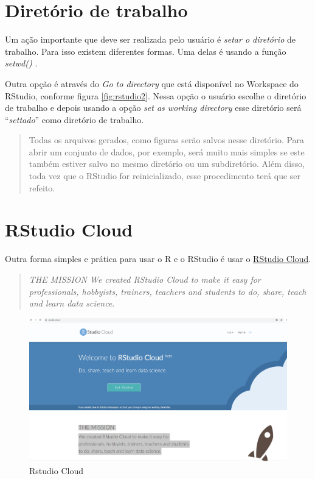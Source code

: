\documentclass[
]{book}
\theoremstyle{definition}
\theoremstyle{definition}
\theoremstyle{definition}
\theoremstyle{remark}
\begin{document}
\hypertarget{diretuxf3rio-de-trabalho}{%
\section{Diretório de trabalho}\label{diretuxf3rio-de-trabalho}}

Um ação importante que deve ser realizada pelo usuário é \emph{setar o diretório} de trabalho. Para isso existem diferentes formas. Uma delas é usando a função \emph{setwd()} .

Outra opção é através do \emph{Go to directory} que está disponível no Workspace do RStudio, conforme figura \ref{fig:rstudio2}. Nessa opção o usuário escolhe o diretório de trabalho e depois usando a opção \emph{set as working directory} esse diretório será ``\emph{settado}'' como diretório de trabalho.

\begin{quote}
Todas os arquivos gerados, como figuras serão salvos nesse diretório. Para abrir um conjunto de dados, por exemplo, será muito mais simples se este também estiver salvo no mesmo diretório ou um subdiretório. Além disso, toda vez que o RStudio for reinicializado, esse procedimento terá que ser refeito.
\end{quote}

\hypertarget{rstudio-cloud}{%
\section{RStudio Cloud}\label{rstudio-cloud}}

Outra forma simples e prática para usar o R e o RStudio é usar o \href{https://rstudio.cloud/}{RStudio Cloud}.

\begin{quote}
\emph{THE MISSION
We created RStudio Cloud to make it easy for professionals, hobbyists, trainers, teachers and students to do, share, teach and learn data science}. \citep{rstudiocloud}
\end{quote}

\begin{figure}
\includegraphics[width=0.9\linewidth]{Figuras/RStudioCloud} \caption{Rstudio Cloud}\label{fig:rstudiocloud}
\end{figure}
\end{document}
